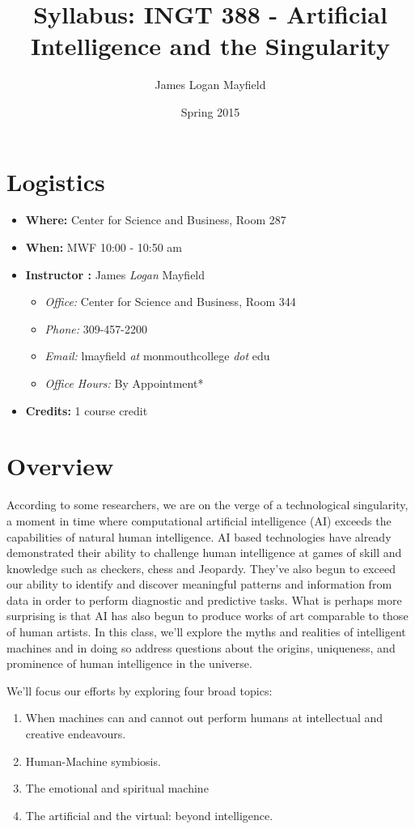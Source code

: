 \documentclass[]{tufte-handout}
\title{Syllabus: INGT 388 - Artificial Intelligence and the Singularity}
\author{James Logan Mayfield }
\date{ Spring 2015 }
\begin{document}
\maketitle

\section{Logistics}
\begin{itemize}
\item \textbf{Where: } Center for Science and Business, Room 287
\item \textbf{When: } MWF 10:00 - 10:50 am
\item \textbf{Instructor :} James \textit{Logan} Mayfield
\begin{itemize}
\item \textit{Office: } Center for Science and Business, Room 344
\item \textit{Phone: } 309-457-2200
\item \textit{Email: } lmayfield \textit{at} monmouthcollege \textit{dot} edu
\item \textit{Office Hours: } By Appointment*
\end{itemize}
\item \textbf{Credits: } 1 course credit
\end{itemize}

\section{Overview}

According to some researchers, we are on the verge of a technological singularity, a moment in time where computational artificial intelligence (AI) exceeds the capabilities of natural human intelligence.  AI based technologies have already demonstrated their ability to challenge human intelligence at games of skill and knowledge such as checkers, chess and Jeopardy. They've also begun to exceed our ability to identify and discover meaningful patterns and information from data in order to perform diagnostic and predictive tasks.  What is perhaps more surprising is that AI has also begun to produce works of art comparable to those of human artists. In this class, we'll explore the myths and realities of intelligent machines and in doing so address questions about the origins, uniqueness, and prominence of human intelligence in the universe.     

We'll focus our efforts by exploring four broad topics:
\begin{enumerate}
\item When machines can and cannot out perform humans at intellectual and creative endeavours.
\item Human-Machine symbiosis. 
\item The emotional and spiritual machine
\item The artificial and the virtual: beyond intelligence.
\end{enumerate}
  
\end{document}

